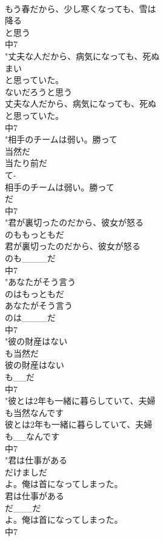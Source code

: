\documentclass[8pt]{extreport}
\begin{document}
\begin{CJK}{UTF8}{min}
\\	もう春だから、少し寒くなっても、雪は
\\	降る
\\	と思う
\\	中7
\\	"丈夫な人だから、病気になっても、死ぬ
\\	まい
\\	と思っていた。
\\	ないだろうと思う	
\\	丈夫な人だから、病気になっても、死ぬ
\\	と思っていた。
\\	中7
\\	"相手のチームは弱い。勝って
\\	当然だ
\\	当たり前だ
\\	て-
\\	相手のチームは弱い。勝って
\\	だ
\\	中7
\\	"君が裏切ったのだから、彼女が怒る
\\	のももっともだ
\\	君が裏切ったのだから、彼女が怒る
\\	のも____だ
\\	中7
\\	"あなたがそう言う
\\	のはもっともだ
\\	あなたがそう言う
\\	のは____だ
\\	中7
\\	"彼の財産はない
\\	も当然だ
\\	彼の財産はない
\\	も__だ
\\	中7
\\	"彼とは2年も一緒に暮らしていて、夫婦
\\	も当然なんです
\\	彼とは2年も一緒に暮らしていて、夫婦
\\	も__なんです
\\	中7
\\	"君は仕事がある
\\	だけましだ
\\	よ。俺は首になってしまった。
\\	君は仕事がある
\\	だ___だ
\\	よ。俺は首になってしまった。
\\	中7

\end{CJK}
\end{document}
